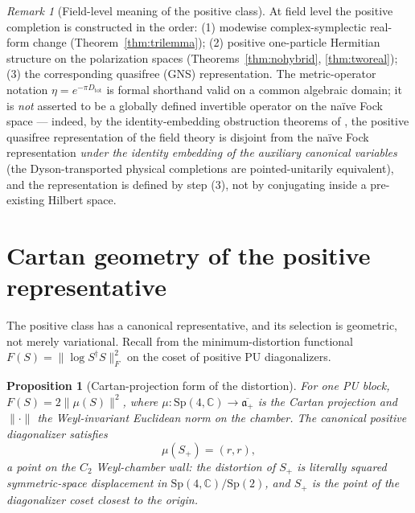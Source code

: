 \documentclass[11pt]{article}
\newtheorem{proposition}[theorem]{Proposition}
\theoremstyle{definition}
\theoremstyle{remark}
\newtheorem{remark}[theorem]{Remark}
\newcommand{\C}{\mathbb{C}}
\newcommand{\Sp}{\mathrm{Sp}}
\newcommand{\dg}{\dagger}
\begin{document}
\begin{remark}[Field-level meaning of the positive class]\label{rem:field}
At field level the positive completion is constructed in the order:
(1) modewise complex-symplectic real-form change
(Theorem~\ref{thm:trilemma}); (2) positive one-particle Hermitian
structure on the polarization spaces (Theorems~\ref{thm:nohybrid},
\ref{thm:tworeal}); (3) the corresponding quasifree (GNS)
representation.  The metric-operator notation
$\eta=e^{-\pi D_{\mathrm{tot}}}$ is formal shorthand valid on a common
algebraic domain; it is \emph{not} asserted to be a globally defined
invertible operator on the na\"ive Fock space --- indeed, by the
identity-embedding obstruction theorems of \cite{companion2,companion3},
the positive quasifree representation of the field theory is disjoint
from the na\"ive Fock representation \emph{under the identity embedding
of the auxiliary canonical variables} (the Dyson-transported physical
completions are pointed-unitarily equivalent), and the representation is
defined by step (3), not by
conjugating inside a pre-existing Hilbert space.
\end{remark}

\section{Cartan geometry of the positive representative}\label{sec:cartan}

The positive class has a canonical representative, and its selection is
geometric, not merely variational.  Recall from \cite{companion2} the
minimum-distortion functional $F(S)=\|\log S^{\dg}S\|_F^2$ on the coset
of positive PU diagonalizers.

\begin{proposition}[Cartan-projection form of the distortion]
\label{prop:cartan}
For one PU block, $F(S)=2\|\mu(S)\|^2$, where
$\mu:\Sp(4,\C)\to\overline{\mathfrak a_+}$ is the Cartan projection and
$\|\cdot\|$ the Weyl-invariant Euclidean norm on the chamber.  The
canonical positive diagonalizer satisfies
\begin{equation}
\mu(S_+)=(r,r),
\end{equation}
a point on the $C_2$ Weyl-chamber wall: the distortion of $S_+$ is
literally squared symmetric-space displacement in $\Sp(4,\C)/\Sp(2)$,
and $S_+$ is the point of the diagonalizer coset closest to the origin.
\end{proposition}
\end{document}
